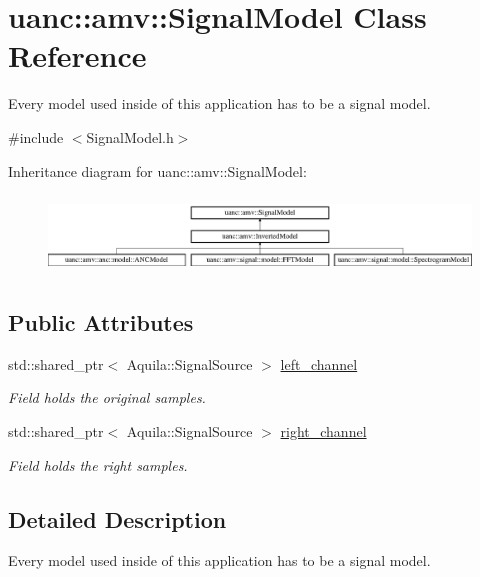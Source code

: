 \hypertarget{classuanc_1_1amv_1_1_signal_model}{}\section{uanc\+:\+:amv\+:\+:Signal\+Model Class Reference}
\label{classuanc_1_1amv_1_1_signal_model}


Every model used inside of this application has to be a signal model.  




{\ttfamily \#include $<$Signal\+Model.\+h$>$}

Inheritance diagram for uanc\+:\+:amv\+:\+:Signal\+Model\+:\begin{figure}[H]
\begin{center}
\leavevmode
\includegraphics[height=2.089552cm]{classuanc_1_1amv_1_1_signal_model}
\end{center}
\end{figure}
\subsection*{Public Attributes}
\begin{DoxyCompactItemize}
\item 
std\+::shared\+\_\+ptr$<$ Aquila\+::\+Signal\+Source $>$ \hyperlink{classuanc_1_1amv_1_1_signal_model_a608802e04d8ce5d49c730d568f0c3fd7}{left\+\_\+channel}
\begin{DoxyCompactList}\small\item\em Field holds the original samples. \end{DoxyCompactList}\item 
std\+::shared\+\_\+ptr$<$ Aquila\+::\+Signal\+Source $>$ \hyperlink{classuanc_1_1amv_1_1_signal_model_a97081cc1295d40bc9410e883bcc02a84}{right\+\_\+channel}
\begin{DoxyCompactList}\small\item\em Field holds the right samples. \end{DoxyCompactList}\end{DoxyCompactItemize}


\subsection{Detailed Description}
Every model used inside of this application has to be a signal model. 

